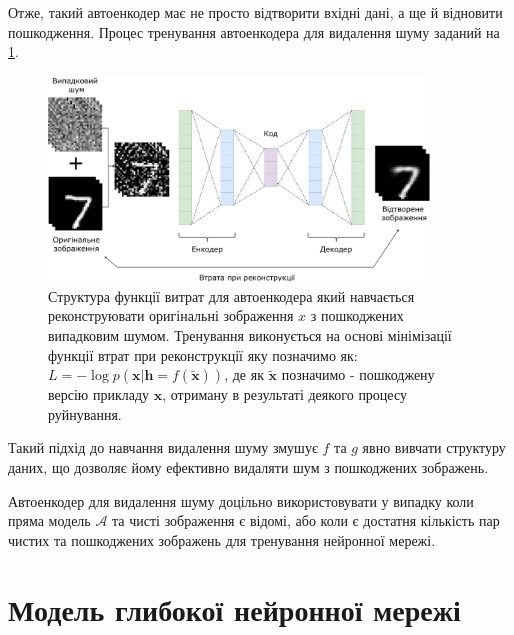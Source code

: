 \documentclass[14pt,a4paper]{extarticle}
\newcounter{e}
\numberwithin{equation}{section}
\numberwithin{figure}{section}
\begin{document}
	Отже, такий автоенкодер має не просто відтворити вхідні дані, а ще й відновити пошкодження. Процес тренування автоенкодера для видалення шуму заданий на \ref{fig:dae-graph}.
	\begin{figure}[h]
		\centering
		\includegraphics[width=0.9\textwidth]{../resources/dae.pdf}
		\caption{
			Структура функції витрат для автоенкодера який навчається реконструювати оригінальні зображення $x$ з пошкоджених випадковим шумом. Тренування виконується на основі мінімізації функції втрат при реконструкції яку позначимо як: $L = - \log p (\boldsymbol {x} | \boldsymbol {h} = f (\tilde {\boldsymbol {x}}))$, де як $\tilde {\boldsymbol {x}}$ позначимо - пошкоджену версію прикладу $\boldsymbol {x}$, отриману в результаті деякого процесу руйнування.
		}
		\label{fig:dae-graph}
	\end{figure}
	Такий підхід до навчання видалення шуму змушує $f$ та $g$ явно вивчати структуру даних, що дозволяє йому ефективно видаляти шум з пошкоджених зображень.
	
	Автоенкодер для видалення шуму доцільно використовувати у випадку коли пряма модель $\mathcal{A}$ та чисті зображення є відомі, або коли є достатня кількість пар чистих та пошкоджених зображень для тренування нейронної мережі. 
	
	\newpage
	\thispagestyle{empty}
	\section{Модель глибокої нейронної мережі}
\end{document}
